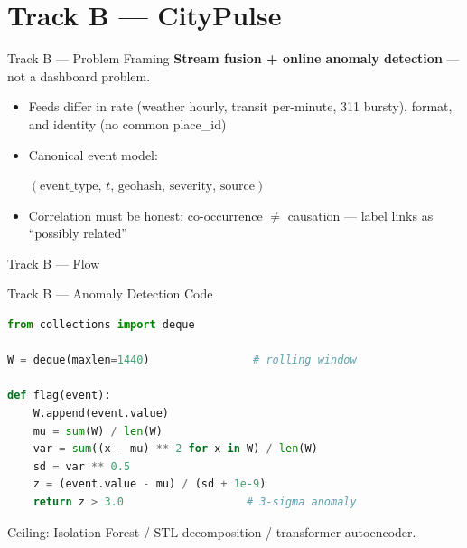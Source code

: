 \documentclass[10pt,aspectratio=169]{beamer}
\begin{document}
\section{Track B — CityPulse}

\begin{frame}{Track B — Problem Framing}
  \textbf{Stream fusion + online anomaly detection} — not a dashboard problem.
  \begin{itemize}
    \item Feeds differ in \alert{rate} (weather hourly, transit per-minute,
      311 bursty), \alert{format}, and \alert{identity} (no common place\_id)
    \item Canonical event model:
      \begin{center}
        $(\text{event\_type},\, t,\,\text{geohash},\,\text{severity},\,\text{source})$
      \end{center}
    \item Correlation must be \alert{honest}: co-occurrence $\neq$ causation —
      label links as ``possibly related''
  \end{itemize}
\end{frame}

\begin{frame}{Track B — Flow}
  \begin{center}
  \end{center}
\end{frame}

\begin{frame}[fragile]{Track B — Anomaly Detection Code}
\begin{lstlisting}[language=Python]
from collections import deque

W = deque(maxlen=1440)                # rolling window

def flag(event):
    W.append(event.value)
    mu = sum(W) / len(W)
    var = sum((x - mu) ** 2 for x in W) / len(W)
    sd = var ** 0.5
    z = (event.value - mu) / (sd + 1e-9)
    return z > 3.0                   # 3-sigma anomaly
\end{lstlisting}
\footnotesize Ceiling: Isolation Forest / STL decomposition / transformer autoencoder.
\end{frame}
\end{document}
